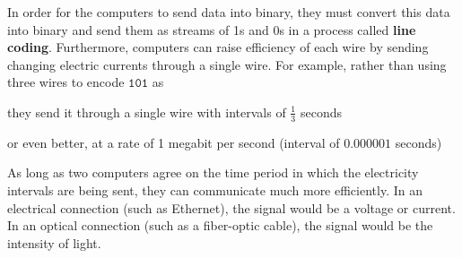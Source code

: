 \documentclass{article}
\newcounter{example}[section]
\newcounter{code}[section]
\begin{document}
  In order for the computers to send data into binary, they must convert this data into binary and send them as streams of 1s and 0s in a process called \textbf{line coding}. Furthermore, computers can raise efficiency of each wire by sending changing electric currents through a single wire. For example, rather than using three wires to encode $\texttt{101}$ as 
  \begin{center}
  \end{center}
  they send it through a single wire with intervals of $\frac{1}{3}$ seconds
  \begin{center}
  \end{center}
  or even better, at a rate of 1 megabit per second (interval of $0.000001$ seconds)
  \begin{center}
  \end{center}

  As long as two computers agree on the time period in which the electricity intervals are being sent, they can communicate much more efficiently. In an electrical connection (such as Ethernet), the signal would be a voltage or current. In an optical connection (such as a fiber-optic cable), the signal would be the intensity of light. 
\end{document}

